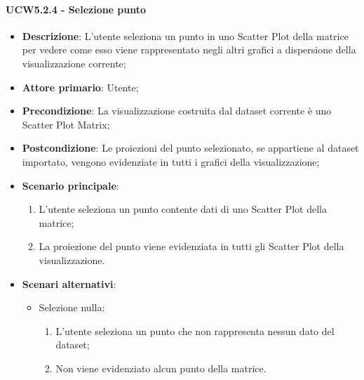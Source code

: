 \paragraph{UCW5.2.4 - Selezione punto}
\label{par:ucw5.2.4}
\begin{itemize}
    \item \textbf{Descrizione}: L'utente seleziona un punto in uno Scatter Plot della matrice per vedere come
          esso viene rappresentato negli altri grafici a dispersione della visualizzazione corrente;

    \item \textbf{Attore primario}: Utente;

    \item \textbf{Precondizione}:   La visualizzazione costruita dal dataset corrente è uno Scatter Plot Matrix;
    \item \textbf{Postcondizione}:  Le proiezioni del punto selezionato, se appartiene al dataset importato,
          vengono evidenziate in tutti i grafici della visualizzazione;

    \item \textbf{Scenario principale}:
          \begin{enumerate}
              \item L'utente seleziona un punto contente dati di uno Scatter Plot della matrice;
              \item La proiezione del punto viene evidenziata in tutti gli Scatter Plot della visualizzazione.
          \end{enumerate}

    \item \textbf{Scenari alternativi}:
          \begin{itemize}
              \item Selezione nulla:
                    \begin{enumerate}
                        \item L'utente seleziona un punto che non rappresenta nessun dato del dataset;
                        \item Non viene evidenziato alcun punto della matrice.
                    \end{enumerate}
          \end{itemize}

\end{itemize}


